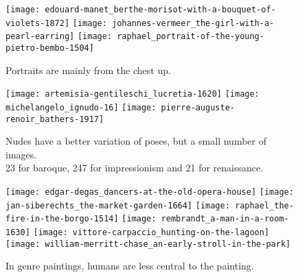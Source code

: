 \begin{figure}
	\centering
    \texttt{[image: edouard-manet\_berthe-morisot-with-a-bouquet-of-violets-1872]}
    \hspace{0.1in}
    \texttt{[image: johannes-vermeer\_the-girl-with-a-pearl-earring]}
    \hspace{0.1in}
    \texttt{[image: raphael\_portrait-of-the-young-pietro-bembo-1504]}
	\caption{
        Portraits are mainly from the chest up.
	}
    \label{fig:wikiart_shortcomings_portraits}
\end{figure}
\begin{figure}
    \centering
    \captionsetup{justification=centering}
    \texttt{[image: artemisia-gentileschi\_lucretia-1620]}
    \hspace{0.1in}
    \texttt{[image: michelangelo\_ignudo-16]}
    \hspace{0.1in}
    \texttt{[image: pierre-auguste-renoir\_bathers-1917]}
	\caption{
        Nudes have a better variation of poses, but a small number of images. \\
        23 for baroque, 247 for impressionism and 21 for renaissance.
	}
    \label{fig:wikiart_shortcomings_nudes}
\end{figure}
\begin{figure}
    \centering
    {
        \texttt{[image: edgar-degas\_dancers-at-the-old-opera-house]}%
        \hspace{0.1in}
        \texttt{[image: jan-siberechts\_the-market-garden-1664]}%
        \hspace{0.1in}
        \texttt{[image: raphael\_the-fire-in-the-borgo-1514]}%
        \vspace{0.1in}
    }
    {%
        \texttt{[image: rembrandt\_a-man-in-a-room-1630]}%
        \hspace{0.1in}
        \texttt{[image: vittore-carpaccio\_hunting-on-the-lagoon]}%
        \hspace{0.1in}
        \texttt{[image: william-merritt-chase\_an-early-stroll-in-the-park]}%
    }
	\caption{
        In genre paintings, humans are less central to the painting.
	}
    \label{fig:wikiart_shortcomings_genre}
\end{figure}
